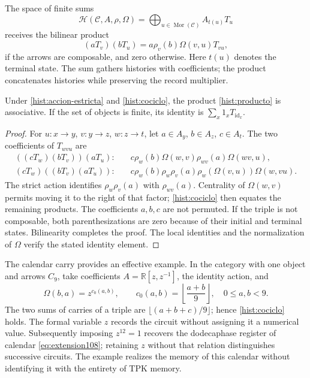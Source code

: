 The space of finite sums
\[
 \mathcal H(\mathcal C,A,\rho,\Omega)
   =\bigoplus_{u\in\operatorname{Mor}(\mathcal C)} A_{t(u)}T_u
\]
receives the bilinear product
\begin{equation}
 (aT_v)(bT_u)=a\rho_v(b)\Omega(v,u)T_{vu},
 \label{hist:producto}
\end{equation}
if the arrows are composable, and zero otherwise. Here \(t(u)\)
denotes the terminal state. The sum gathers histories with coefficients; the
product concatenates histories while preserving the record multiplier.

\begin{proposition}
Under \eqref{hist:accion-estricta} and \eqref{hist:cociclo}, the product
\eqref{hist:producto} is associative. If the set of objects is finite,
its identity is \(\sum_x1_xT_{\operatorname{id}_x}\).
\end{proposition}
\begin{proof}
For \(u:x\to y\), \(v:y\to z\), \(w:z\to t\), let
\(a\in A_y\), \(b\in A_z\), \(c\in A_t\). The two coefficients
of \(T_{wvu}\) are
\begin{align*}
 ((cT_w)(bT_v))(aT_u):\quad&
 c\rho_w(b)\Omega(w,v)\rho_{wv}(a)\Omega(wv,u),\\
 (cT_w)((bT_v)(aT_u)):\quad&
 c\rho_w(b)\rho_w\rho_v(a)\rho_w(\Omega(v,u))\Omega(w,vu).
\end{align*}
The strict action identifies \(\rho_w\rho_v(a)\) with \(\rho_{wv}(a)\).
Centrality of \(\Omega(w,v)\) permits moving it to the right of
that factor; \eqref{hist:cociclo} then equates the remaining products.
The coefficients \(a,b,c\) are not permuted. If the triple is not composable,
both parenthesizations are zero because of their initial and terminal states.
Bilinearity completes the proof. The local identities and the
normalization of \(\Omega\) verify the stated identity element.
\end{proof}

The calendar carry provides an effective example. In the category
with one object and arrows \(C_9\), take coefficients
\(A=\mathbb R[z,z^{-1}]\), the identity action, and
\[
 \Omega(b,a)=z^{c_0(a,b)},\qquad
 c_0(a,b)=\left\lfloor\frac{a+b}{9}\right\rfloor,
 \quad 0\leq a,b<9.
\]
The two sums of carries of a triple are
\(\lfloor(a+b+c)/9\rfloor\); hence
\eqref{hist:cociclo} holds. The formal variable \(z\) records the circuit without
assigning it a numerical value. Subsequently imposing \(z^{12}=1\) recovers the
dodecaphase register of calendar \eqref{eq:extension108}; retaining
\(z\) without that relation distinguishes successive circuits. The example realizes
the memory of this calendar without identifying it with the entirety of
TPK memory.


